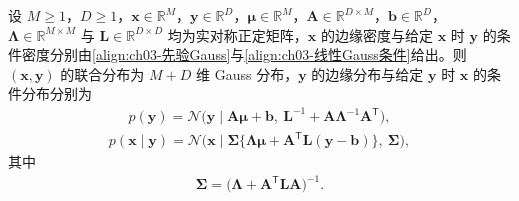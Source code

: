 \documentclass[../../main.tex]{subfiles}
\begin{document}
\begin{proposition}\label{proposition:ch03-线性GaussBayes}
设 $M\geqslant1$，$D\geqslant1$，$\boldsymbol{x}\in\mathbb{R}^{M}$，$\boldsymbol{y}\in\mathbb{R}^{D}$，$\boldsymbol{\mu}\in\mathbb{R}^{M}$，$\boldsymbol{A}\in\mathbb{R}^{D\times M}$，$\boldsymbol{b}\in\mathbb{R}^{D}$，$\boldsymbol{\Lambda}\in\mathbb{R}^{M\times M}$ 与 $\boldsymbol{L}\in\mathbb{R}^{D\times D}$ 均为实对称正定矩阵，$\boldsymbol{x}$ 的边缘密度与给定 $\boldsymbol{x}$ 时 $\boldsymbol{y}$ 的条件密度分别由\eqref{align:ch03-先验Gauss}与\eqref{align:ch03-线性Gauss条件}给出。则 $(\boldsymbol{x},\boldsymbol{y})$ 的联合分布为 $M+D$ 维 Gauss 分布，$\boldsymbol{y}$ 的边缘分布与给定 $\boldsymbol{y}$ 时 $\boldsymbol{x}$ 的条件分布分别为
\begin{align*}
p(\boldsymbol{y})=\mathcal{N}\bigl(\boldsymbol{y}\mid\boldsymbol{A}\boldsymbol{\mu}+\boldsymbol{b},\ \boldsymbol{L}^{-1}+\boldsymbol{A}\boldsymbol{\Lambda}^{-1}\boldsymbol{A}^{\mathsf{T}}\bigr),
\end{align*}
\begin{align*}
p(\boldsymbol{x}\mid\boldsymbol{y})=\mathcal{N}\bigl(\boldsymbol{x}\mid\boldsymbol{\Sigma}\{\boldsymbol{\Lambda}\boldsymbol{\mu}+\boldsymbol{A}^{\mathsf{T}}\boldsymbol{L}(\boldsymbol{y}-\boldsymbol{b})\},\ \boldsymbol{\Sigma}\bigr),
\end{align*}
其中
\begin{align}
\boldsymbol{\Sigma}=\bigl(\boldsymbol{\Lambda}+\boldsymbol{A}^{\mathsf{T}}\boldsymbol{L}\boldsymbol{A}\bigr)^{-1}.
\label{align:ch03-后验协方差形式}
\end{align}
\end{proposition}
\end{document}
